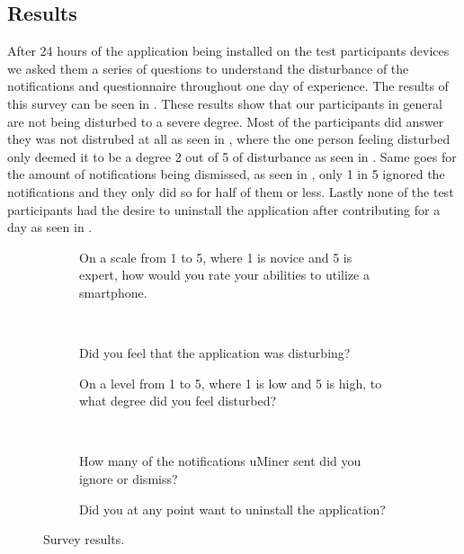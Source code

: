 \subsection{Results}
\label{sub:results}
After 24 hours of the application being installed on the test participants devices we asked them a series of questions to understand the disturbance of the notifications and questionnaire throughout one day of experience. The results of this survey can be seen in . These results show that our participants in general are not being disturbed to a severe degree. Most of the participants did answer they was not distrubed at all as seen in , where the one person feeling disturbed only deemed it to be a degree 2 out of 5 of disturbance as seen in . Same goes for the amount of notifications being dismissed, as seen in , only 1 in 5 ignored the notifications and they only did so for half of them or less. Lastly none of the test participants had the desire to uninstall the application after contributing for a day as seen in .


\begin{figure}[!htbp]
    \begin{subfigure}[!t]{.45\textwidth}
      \centering
        
        \caption{On a scale from 1 to 5, where 1 is novice and 5 is expert, how would you rate your abilities to utilize a smartphone.}
      \label{fig:smartphone_ability}
    \end{subfigure}
    ~
    \begin{subfigure}[!htbp]{.45\textwidth}
      \centering
        
      \caption{Did you feel that the application was disturbing?}
      \label{fig:general_disturbance}
    \end{subfigure}
    \vspace{1em}
    \begin{subfigure}[!htbp]{.45\textwidth}
      \centering
        
      \caption{On a level from 1 to 5, where 1 is low and 5 is high, to what degree did you feel disturbed?}
      \label{fig:disturbance_level}
    \end{subfigure}
    ~
    \begin{subfigure}[!htbp]{.45\textwidth}
      \centering
        
      \caption{How many of the notifications uMiner sent did you ignore or dismiss?}
      \label{fig:ingore_notifications}
    \end{subfigure}
    \vspace{1em}
    \begin{subfigure}[!htbp]{\textwidth}
      \centering
        
      \caption{Did you at any point want to uninstall the application?}
      \label{fig:want_to_uninstall}
    \end{subfigure}
    \caption{Survey results.}
    \label{fig:survey_results}
    \end{figure}
\FloatBarrier

